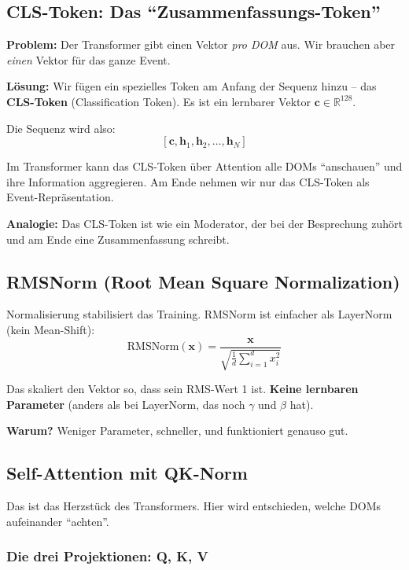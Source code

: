 \documentclass[12pt, a4paper]{article}
\begin{document}
\subsection{CLS-Token: Das ``Zusammenfassungs-Token''}

\textbf{Problem:} Der Transformer gibt einen Vektor \textit{pro DOM} aus.
Wir brauchen aber \textit{einen} Vektor f\"ur das ganze Event.

\textbf{L\"osung:} Wir f\"ugen ein spezielles Token am Anfang der Sequenz
hinzu -- das \textbf{CLS-Token} (Classification Token). Es ist ein
lernbarer Vektor $\mathbf{c} \in \mathbb{R}^{128}$.

Die Sequenz wird also:
\[
    [\mathbf{c}, \mathbf{h}_1, \mathbf{h}_2, \ldots, \mathbf{h}_N]
\]

Im Transformer kann das CLS-Token \"uber Attention alle DOMs ``anschauen''
und ihre Information aggregieren. Am Ende nehmen wir nur das CLS-Token
als Event-Repr\"asentation.

\textbf{Analogie:} Das CLS-Token ist wie ein Moderator, der bei der
Besprechung zuh\"ort und am Ende eine Zusammenfassung schreibt.

\subsection{RMSNorm (Root Mean Square Normalization)}

Normalisierung stabilisiert das Training. RMSNorm ist einfacher als
LayerNorm (kein Mean-Shift):
\[
    \text{RMSNorm}(\mathbf{x}) = \frac{\mathbf{x}}{\sqrt{\frac{1}{d}\sum_{i=1}^d x_i^2}}
\]

Das skaliert den Vektor so, dass sein RMS-Wert 1 ist. \textbf{Keine
lernbaren Parameter} (anders als bei LayerNorm, das noch $\gamma$ und
$\beta$ hat).

\textbf{Warum?} Weniger Parameter, schneller, und funktioniert genauso gut.

\subsection{Self-Attention mit QK-Norm}

Das ist das Herzst\"uck des Transformers. Hier wird entschieden, welche
DOMs aufeinander ``achten''.

\subsubsection{Die drei Projektionen: Q, K, V}
\end{document}
